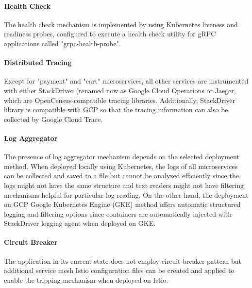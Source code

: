 \documentclass{Configuration_Files/PoliMi3i_thesis}
\begin{document}
\paragraph{Health Check} The health check mechanism is implemented by using Kubernetes liveness and readiness probes, configured to execute a health check utility for gRPC applications called "grpc-health-probe"\footnotemark[73].

\paragraph{Distributed Tracing} Except for "payment" and "cart" microservices, all other services are instrumented with either StackDriver (renamed now as Google Cloud Operations\footnotemark[74] or Jaeger, which are OpenCensus-compatible tracing libraries.
Additionally, StackDriver library is compatible with GCP so that the tracing information can also be collected by Google Cloud Trace\footnotemark[75].

\paragraph{Log Aggregator} The presence of log aggregator mechanism depends on the selected deployment method.
When deployed locally using Kubernetes, the logs of all microservices can be collected and saved to a file but cannot be analyzed efficiently since the logs might not have the same structure and text readers might not have filtering mechanisms helpful for particular log reading.
On the other hand, the deployment on GCP Google Kubernetes Engine (GKE) method offers automatic structured logging and filtering options since containers are automatically injected with StackDriver logging agent when deployed on GKE.

\paragraph{Circuit Breaker} The application in its current state does not employ circuit breaker pattern but additional service mesh Istio configuration files can be created and applied to enable the tripping mechanism when deployed on Istio.
\end{document}
